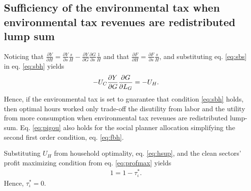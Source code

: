 
\subsection{Sufficiency of the environmental tax when environmental tax revenues are redistributed lump sum}\label{app:incometax0}

Noticing that $\frac{\partial Y}{\partial H}= \frac{\partial Y}{\partial s}\frac{s}{H}-\frac{\partial Y}{\partial G}\frac{\partial G}{\partial s}\frac{1}{H}$ and that $\frac{\partial F}{\partial H}=\frac{\partial F}{\partial s}\frac{s}{H}$, and substituting eq. \eqref{eq:sbs} in eq. \eqref{eq:sbh} yields
\begin{align}\label{eq:pigou}
-U_C \frac{\partial Y}{\partial G}\frac{\partial{G}}{\partial{L_G}}=-U_H.
\end{align}
Hence, if the environmental tax is set to guarantee that condition \eqref{eq:sbh} holds, then optimal hours worked only trade-off the disutility from labor and the utility from more consumption when environmental tax revenues are redistributed lump-sum.
Eq. \eqref{eq:pigou} also holds for the social planner allocation simplifying the second first order condition, eq. \eqref{eq:fbh}.


Substituting $U_H$ from household optimality, eq. \eqref{eq:hsup}, and the clean sectors' profit maximizing condition from eq. \eqref{eq:profmax} yields
\begin{align}
1=1-\tau^*_\iota.\nonumber
\end{align}
Hence, $\tau^*_\iota =0$. 

%
